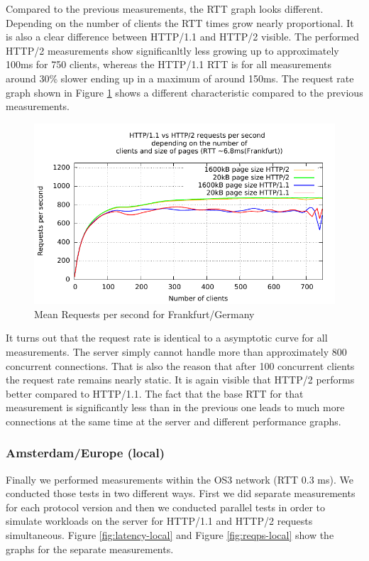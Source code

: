 Compared to the previous measurements, the RTT graph looks different. Depending on the number of clients the RTT times grow nearly proportional. It is also a clear difference between HTTP/1.1 and HTTP/2 visible. The performed HTTP/2 measurements show significanltly less growing up to approximately 100ms for 750 clients, whereas the HTTP/1.1 RTT is for all measurements around 30\% slower ending up in a maximum of around 150ms. The  request rate graph shown in Figure \ref{fig:reqps-frankfurt} shows a different characteristic compared to the previous measurements.

\begin{figure}[H]
	\centering
	\includegraphics[scale=1,trim=0.0cm .0cm .0cm .0cm,clip]{images/reqps-frankfurt.pdf}
	\caption{Mean Requests per second for Frankfurt/Germany}
	\label{fig:reqps-frankfurt}
\end{figure}

It turns out that the request rate is identical to a asymptotic curve for all measurements. The server simply cannot handle more than approximately 800 concurrent connections. That is also the reason that after 100 concurrent clients the request rate remains nearly static. It is again visible that HTTP/2 performs better compared to HTTP/1.1. The fact that the base RTT for that measurement is significantly less than in the previous one leads to much more connections at the same time at the server and different performance graphs.

\subsubsection{Amsterdam/Europe (local)}

Finally we performed measurements within the OS3 network (RTT 0.3 ms). We conducted those tests in two different ways. First we did separate measurements for each protocol version and then we conducted parallel tests in order to simulate workloads on the server for HTTP/1.1 and HTTP/2 requests simultaneous. Figure \ref{fig:latency-local} and Figure \ref{fig:reqps-local} show the graphs for the separate measurements.

